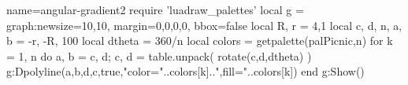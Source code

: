 \documentclass{standalone}
\begin{document}
\begin{luadraw}{name=angular-gradient2}
require 'luadraw_palettes'
local g = graph:new{size={10,10}, margin={0,0,0,0}, bbox=false}
local R, r = 4,1
local c, d, n, a, b = -r, -R, 100
local dtheta = 360/n
local colors = getpalette(palPicnic,n)
for k = 1, n do
    a, b = c, d; 
    c, d = table.unpack( rotate({c,d},dtheta) )
    g:Dpolyline({a,b,d,c},true,"color="..colors[k]..",fill="..colors[k])
end
g:Show()
\end{luadraw}
\end{document}

